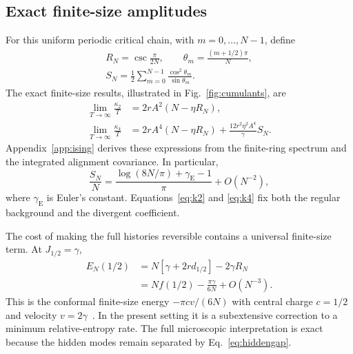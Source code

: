 \documentclass[aps,pre,reprint,amsmath,amssymb,longbibliography,floatfix]{revtex4-2}
\begin{document}
\subsection{Exact finite-size amplitudes}
For this uniform periodic critical chain, with $m=0,\ldots,N-1$, define
\begin{equation}
 \begin{gathered}
 R_N=\csc\frac{\pi}{2N},\qquad
 \theta_m=\frac{(m+1/2)\pi}{N},\\
 S_N=\frac12\sum_{m=0}^{N-1}\frac{\cos^2\theta_m}{\sin\theta_m}.
 \end{gathered}
 \label{eq:RS}
\end{equation}
The exact finite-size results, illustrated in Fig.~\ref{fig:cumulants}, are
\begin{align}
 \lim_{T\to\infty}\frac{\kappa_2}{T}
 &=2rA^2(N-\eta R_N),\label{eq:k2}\\
 \lim_{T\to\infty}\frac{\kappa_4}{T}
 &=2rA^4(N-\eta R_N)
   +\frac{12r^2\eta^2 A^4}{\gamma}S_N.\label{eq:k4}
\end{align}
Appendix~\ref{app:ising} derives these expressions from the finite-ring
spectrum and the integrated alignment covariance. In particular,
\begin{equation}
 \frac{S_N}{N}=\frac{\log(8N/\pi)+\gamma_{\mathrm E}-1}{\pi}
 +O(N^{-2}),
 \label{eq:Sasym}
\end{equation}
where $\gamma_{\mathrm E}$ is Euler's constant. Equations~\eqref{eq:k2}
and \eqref{eq:k4} fix both the regular background and the divergent
coefficient.

The cost of making the full histories reversible contains a universal
finite-size term. At $J_{1/2}=\gamma$,
\begin{align}
 E_N(1/2)&=N\left[\gamma+2r d_{1/2}\right]-2\gamma R_N\nonumber\\
 &=N f(1/2)-\frac{\pi\gamma}{6N}+O(N^{-3}).
 \label{eq:casimir}
\end{align}
This is the conformal finite-size energy
$-\pi c v/(6N)$ with central charge $c=1/2$ and velocity
$v=2\gamma$~\cite{Affleck1986,BloteCardyNightingale1986}.
In the present setting it is a subextensive correction to a minimum
relative-entropy rate. The full microscopic interpretation is exact
because the hidden modes remain separated by Eq.~\eqref{eq:hiddengap}.
\end{document}
